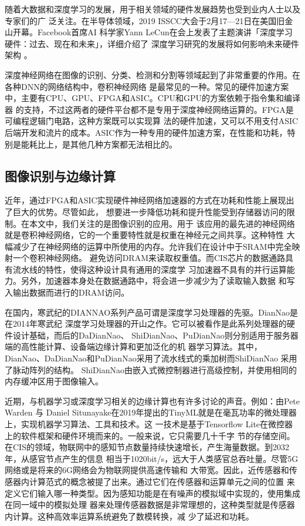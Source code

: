 随着大数据和深度学习的发展，用于相关领域的硬件发展趋势也受到业内人士以及专家们的广
泛关注。在半导体领域，2019 ISSCC大会于2月17—21日在美国旧金山开幕。Facebook首席AI
科学家Yann LeCun在会上发表了主题演讲「深度学习硬件：过去、现在和未来」，详细介绍了
深度学习研究的发展将如何影响未来硬件架构%
。  

深度神经网络在图像的识别、分类、检测和分割等领域起到了非常重要的作用。在各种DNN的网络结构中，卷积神经网络
是最常见的一种。常见的硬件加速方案中，主要有CPU、GPU、FPGA和ASIC。CPU和GPU的方案依赖于指令集和编译器
的支持，不过这两者的硬件平台都不是专用于深度神经网络运算的。FPGA是可编程逻辑门电路，这种方案既可以实现算
法的硬件加速，又可以不用支付ASIC后端开发和流片的成本。ASIC作为一种专用的硬件加速方案，在性能和功耗，特
别是能耗比上，是其他几种方案都无法相比的。


\subsection{图像识别与边缘计算}

近年，通过FPGA和ASIC实现硬件神经网络加速器的方式在功耗和性能上展现出了巨大的优势。尽管如此，
想要进一步降低功耗和提升性能受到存储器访问的限制。在本文中，我们关注的是图像识别的应用。用于
该应用的最先进的神经网络就是卷积神经网络，它的一个重要特性就是权重在神经元之间共享。这种特性
大幅减少了在神经网络的运算中所使用的内存。允许我们在设计中于SRAM中完全映射一个卷积神经网络。
避免访问DRAM来读取权重值。而CIS芯片的数据通路具有流水线的特性，使得这种设计具有通用的深度学
习加速器不具有的并行运算能力。另外，加速器本身处在数据通路中，将会进一步减少为了读取输入数据
和写入输出数据而进行的DRAM访问。  

在国内，寒武纪的DIANNAO系列产品可谓是深度学习处理器的先驱。DianNao是在2014年寒武纪
深度学习处理器的开山之作。它可以被看作是此系列处理器的硬件设计基础，而后的DaDianNao、
ShiDianNao、PuDianNao则分别适用于服务器端的高性能计算、设备端边缘计算和更加泛化的机
器学习算法。其中，DianNao、DaDianNao和PuDianNao采用了流水线式的乘加树而ShiDianNao
采用了脉动阵列的结构。%
ShiDianNao由嵌入式微控制器进行高级控制，并使用相同的内存缓冲区用于图像输入。  

近期，与机器学习或深度学习相关的边缘计算也有许多讨论的声音。例如：由Pete Warden 与 Daniel 
Situnayake在2019年提出的TinyML就是在毫瓦功率的微处理器上，实现机器学习算法、工具和技术。这
一技术是基于Tensorflow Lite在微控器上的软件框架和硬件环境而来的。一般来说，它只需要几十千字
节的存储空间。  
在CIS的领域，物联网中的感知节点数量持续快速增长，产生海量数据。到2032年，从感官节点产生的信息
相当于1020bit/s，远大于人类感官总吞吐量。尽管5G网络或是将来的6G网络会为物联网提供高速传输和
大带宽。因此，近传感器和传感器内计算范式的概念被提了出来。通过它们在传感器和运算单元之间的位置
来定义它们输入哪一种类型。因为感知功能是在有噪声的模拟域中实现的，使用集成在同一域中的模拟处理
器来处理传感器数据是非常理想的，这种类型就是传感器内计算。这种高效率运算系统避免了数模转换，减
少了延迟和功耗。




